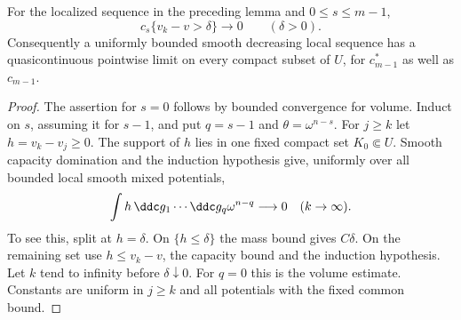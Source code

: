 \begin{proposition}\label{draft621:smooth-capacity-convergence}
For the localized sequence in the preceding lemma and
$0\leq s\leq m-1$,
\[
 c_s\{v_k-v>\delta\}\longrightarrow0
                 \qquad(\delta>0).
\]
Consequently a uniformly bounded smooth decreasing local sequence
has a quasicontinuous pointwise limit on every compact subset of
$U$, for $c_{m-1}^*$ as well as $c_{m-1}$.
\end{proposition}
\begin{proof}
The assertion for $s=0$ follows by bounded convergence for volume.
Induct on $s$, assuming it for $s-1$, and put $q=s-1$ and
$\theta=\omega^{n-s}$. For $j\geq k$ let $h=v_k-v_j\geq0$.
The support of $h$ lies in one fixed compact set $K_0\Subset U$.
Smooth capacity domination and the induction hypothesis give,
uniformly over all bounded local smooth mixed potentials,
\begin{equation}\label{eq:draft621:lower-weight}
 \int h\,\ddc g_1\cdots\ddc g_q\omega^{n-q}
                          \longrightarrow0\quad(k\to\infty).
\end{equation}
To see this, split at $h=\delta$. On $\{h\leq\delta\}$ the mass
bound gives $C\delta$. On the remaining set use $h\leq v_k-v$,
the capacity bound and the induction hypothesis. Let $k$ tend to
infinity before $\delta\downarrow0$. For $q=0$ this is the volume
estimate. Constants are uniform in $j\geq k$ and all potentials
with the fixed common bound.


\end{proof}
